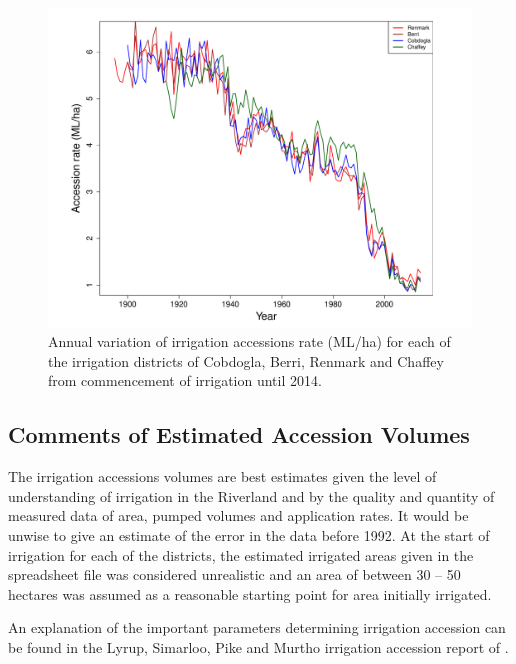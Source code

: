 \documentclass[a4paper, titlepage, 12pt]{article}\usepackage[]{graphicx}\usepackage[]{color}
\makeatletter
\def\maxwidth{ %
  \ifdim\Gin@nat@width>\linewidth
    \linewidth
  \else
    \Gin@nat@width
  \fi
}
\newenvironment{knitrout}{}{} %
\makeatother
\begin{document}
\begin{sffamily}
\begin{figure} 
\begin{knitrout}
\color{fgcolor}
\includegraphics[width=\maxwidth]{../figures/plotacc-1} 

\end{knitrout}
\caption{Annual variation of irrigation accessions rate (ML/ha) for each of the irrigation districts of Cobdogla, Berri, Renmark and Chaffey from commencement of irrigation until 2014.}
\label{fig03}
\end{figure}


\subsection{Comments of Estimated Accession Volumes}
The irrigation accessions volumes are best estimates given the level of understanding of irrigation in the Riverland and by the quality and quantity of measured data of area, pumped volumes and application rates. It would be unwise to give an estimate of the error in the data before 1992. At the start of irrigation for each of the districts, the estimated irrigated areas given in the spreadsheet file was considered unrealistic and an area of between 30 -- 50 hectares was assumed as a reasonable starting point for area initially irrigated. 

An explanation of the important parameters determining irrigation accession can be found in the Lyrup, Simarloo, Pike and Murtho irrigation accession report of \citet{Meissner2014}.


\end{sffamily}
\end{document}
